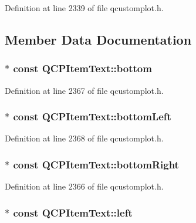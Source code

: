 Definition at line 2339 of file qcustomplot.\-h.



\subsection{Member Data Documentation}
\hypertarget{class_q_c_p_item_text_a94aeec080f877d3d1d0c3d8ffc10e9e6}{
\subsubsection[{bottom}]{$\ast$ const Q\-C\-P\-Item\-Text\-::bottom}}\label{class_q_c_p_item_text_a94aeec080f877d3d1d0c3d8ffc10e9e6}


Definition at line 2367 of file qcustomplot.\-h.

\hypertarget{class_q_c_p_item_text_a6a1c872ad3789ecafcaeac2066e218a0}{
\subsubsection[{bottom\-Left}]{$\ast$ const Q\-C\-P\-Item\-Text\-::bottom\-Left}}\label{class_q_c_p_item_text_a6a1c872ad3789ecafcaeac2066e218a0}


Definition at line 2368 of file qcustomplot.\-h.

\hypertarget{class_q_c_p_item_text_a8ad47045c29af43b0312f7d93bb74374}{
\subsubsection[{bottom\-Right}]{$\ast$ const Q\-C\-P\-Item\-Text\-::bottom\-Right}}\label{class_q_c_p_item_text_a8ad47045c29af43b0312f7d93bb74374}


Definition at line 2366 of file qcustomplot.\-h.

\hypertarget{class_q_c_p_item_text_ab8c6c6e1df36256986fab1463c0a1d38}{
\subsubsection[{left}]{$\ast$ const Q\-C\-P\-Item\-Text\-::left}}\label{class_q_c_p_item_text_ab8c6c6e1df36256986fab1463c0a1d38}


